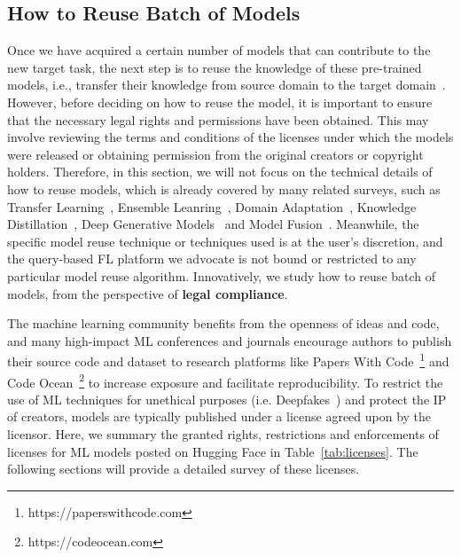 \subsection{How to Reuse Batch of Models}
\label{how2reuse}
Once we have acquired a certain number of models that can contribute to the new target task, the next step is to reuse the knowledge of these pre-trained models, i.e., transfer their knowledge from source domain to the target domain~\cite{pan2009survey}.
However, before deciding on how to reuse the model, it is important to ensure that the necessary legal rights and permissions have been obtained. 
This may involve reviewing the terms and conditions of the licenses under which the models were released or obtaining permission from the original creators or copyright holders.
Therefore, in this section, we will not focus on the technical details of how to reuse models, which is already covered by many related surveys, such as Transfer Learning~\cite{pan2009survey}, Ensemble Leanring~\cite{zhou2012ensemble}, Domain Adaptation~\cite{wang2018deep}, Knowledge Distillation~\cite{wang2021knowledge}, Deep Generative Models~\cite{cao2022survey} and Model Fusion~\cite{ji2021emerging}.
Meanwhile, the specific model reuse technique or techniques used is at the user's discretion, and the query-based FL platform we advocate is not bound or restricted to any particular model reuse algorithm.
Innovatively, we study how to reuse batch of models, from the perspective of \textbf{legal compliance}.

The machine learning community benefits from the openness of ideas and code, and many high-impact ML conferences and journals encourage authors to publish their source code and dataset to research platforms like Papers With Code~\footnote{https://paperswithcode.com} and Code Ocean~\footnote{https://codeocean.com} to increase exposure and facilitate reproducibility.
To restrict the use of ML techniques for unethical purposes (i.e. Deepfakes~\cite{mirsky2021creation}) and protect the IP of creators, models are typically published under a license agreed upon by the licensor.
Here, we summary the granted rights, restrictions and enforcements of licenses for ML models posted on Hugging Face in Table~\ref{tab:licenses}.
The following sections will provide a detailed survey of these licenses.


